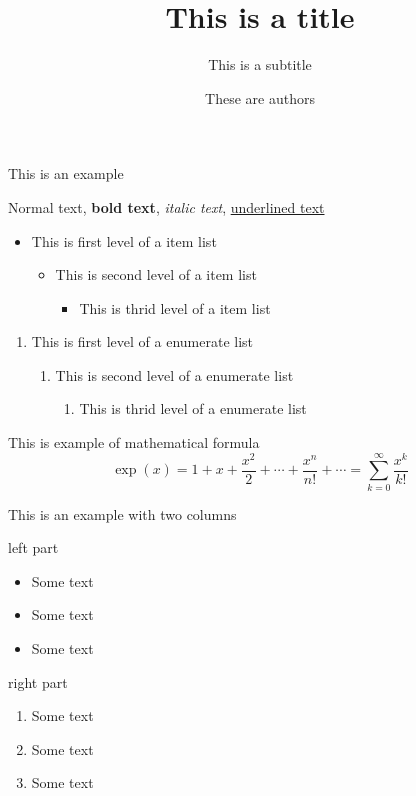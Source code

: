 \documentclass[aspectratio=169]{beamer}
\title{This is a title}
\subtitle{This is a subtitle}
\author{These are authors}
\begin{document}
\begin{frame}
\titlepage
\end{frame}

\begin{frame}{This is an example}

Normal text, \textbf{bold text}, \textit{italic text}, \underline{underlined text}
\vfill
\begin{itemize}
    \item This is first level of a item list
    \begin{itemize}
        \item This is second level of a item list
        \begin{itemize}
            \item This is thrid level of a item list
        \end{itemize}
    \end{itemize}
\end{itemize}
\vfill
\begin{enumerate}
    \item This is first level of a enumerate list
    \begin{enumerate}
        \item This is second level of a enumerate list
        \begin{enumerate}
            \item This is thrid level of a enumerate list
        \end{enumerate}
    \end{enumerate}
\end{enumerate}
\vfill
This is example of mathematical formula
\[
    \exp(x) = 1 + x + \frac{x^2}{2}  + \cdots + \frac{x^n}{n!} + \cdots = \sum_{k=0}^\infty \frac{x^k}{k!}
\]

\end{frame}

\begin{frame}{This is an example with two columns}
    \begin{minipage}[t]{0.49\linewidth}
        left part
        
        \begin{itemize}
            \item Some text
            \item Some text
            \item Some text
        \end{itemize}
    \end{minipage}
    \hfill
    \begin{minipage}[t]{0.49\linewidth}
        right part
        \begin{enumerate}
            \item Some text
            \item Some text
            \item Some text
        \end{enumerate}
    \end{minipage}
\end{frame}

\end{document}
